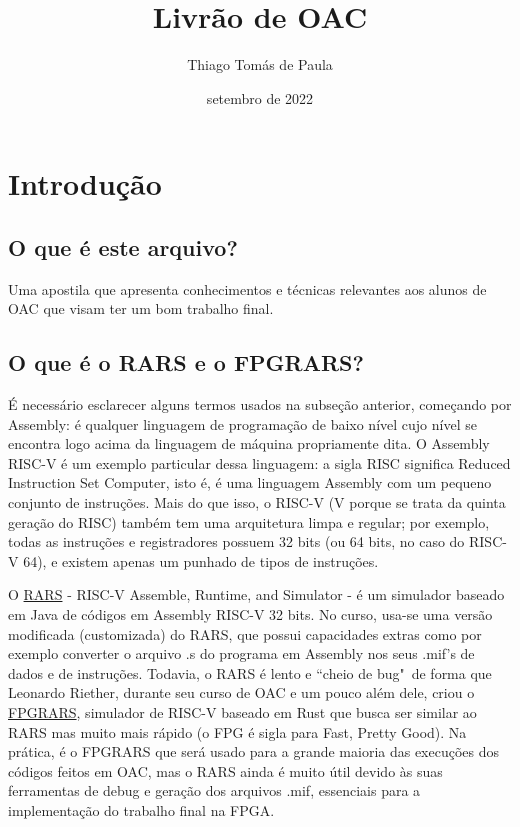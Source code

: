 \documentclass[10pt, a4paper, twoside]{article}
\title{\sf\textbf{Livrão de OAC}}
\author{Thiago Tomás de Paula}
\date{setembro de 2022}
\begin{document}
  
  \maketitle
  \tableofcontents
  
  \clearpage
  \section{Introdução}
    \subsection{O que é este arquivo?}
        Uma apostila que apresenta conhecimentos e técnicas relevantes aos alunos de OAC que visam ter um bom trabalho final.
        
    \subsection{O que é o RARS e o FPGRARS?}
        É necessário esclarecer alguns termos usados na subseção anterior, começando por Assembly:
        é qualquer linguagem de programação de baixo nível cujo nível se encontra logo acima da linguagem de máquina propriamente dita.
        O Assembly RISC-V é um exemplo particular dessa linguagem:
        a sigla RISC significa Reduced Instruction Set Computer, isto é, é uma linguagem Assembly com um pequeno conjunto de instruções.
        Mais do que isso, o RISC-V (V porque se trata da quinta geração do RISC) também tem uma arquitetura limpa e regular; por exemplo, todas as instruções e registradores possuem 32 bits (ou 64 bits, no caso do RISC-V 64), e existem apenas um punhado de tipos de instruções.
        
        O \href{https://github.com/TheThirdOne/rars}{RARS} - RISC-V Assemble, Runtime, and Simulator - é um simulador baseado em Java de códigos em Assembly RISC-V 32 bits. 
        No curso, usa-se uma versão modificada (customizada) do RARS, que possui capacidades extras como por exemplo converter o arquivo .s do programa em Assembly nos seus .mif's de dados e de instruções.
        Todavia, o RARS é lento e ``cheio de bug"~de forma que Leonardo Riether, durante seu curso de OAC e um pouco além dele, criou o \href{https://github.com/LeoRiether/FPGRARS}{FPGRARS}, simulador de RISC-V baseado em Rust que busca ser similar ao RARS mas muito mais rápido (o FPG é sigla para Fast, Pretty Good).
        Na prática, é o FPGRARS que será usado para a grande maioria das execuções dos códigos feitos em OAC, mas o RARS ainda é muito útil devido às suas ferramentas de debug e geração dos arquivos .mif, essenciais para a implementação do trabalho final na FPGA. 
    
\end{document}
